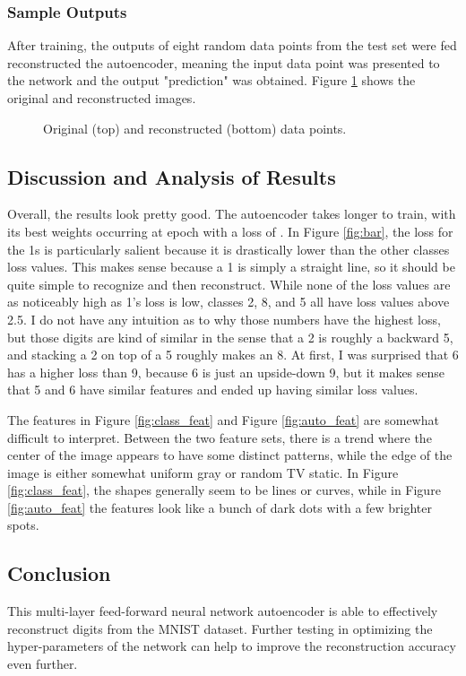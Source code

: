 \documentclass[a4paper, 12pt, titlepage]{article}
\newcommand{\figRef}[1]{Figure \ref{#1}}
\begin{document}
  \subsubsection{Sample Outputs}
  \par After training, the outputs of eight random data points from the test
  set were fed reconstructed the autoencoder, meaning the input data point was
  presented to the network and the output "prediction" was obtained.
  \figRef{fig:samples} shows the original and reconstructed images.
  \begin{figure}[htb]
    \centering
    
    \caption{Original (top) and reconstructed (bottom) data points.}
    \label{fig:samples}
  \end{figure}

  \subsection{Discussion and Analysis of Results}
  \par Overall, the results look pretty good.
  The autoencoder takes longer to train, with its best weights occurring at
  epoch \unskip{} with a loss of
  \unskip{}.
  In \figRef{fig:bar}, the loss for the 1s is particularly salient because it
  is drastically lower than the other classes loss values.
  This makes sense because a 1 is simply a straight line, so it should be quite
  simple to recognize and then reconstruct.
  While none of the loss values are as noticeably high as 1's loss is low,
  classes 2, 8, and 5 all have loss values above 2.5.
  I do not have any intuition as to why those numbers have the highest loss,
  but those digits are kind of similar in the sense that a 2 is roughly a
  backward 5, and stacking a 2 on top of a 5 roughly makes an 8.
  At first, I was surprised that 6 has a higher loss than 9, because 6 is just
  an upside-down 9, but it makes sense that 5 and 6 have similar features and
  ended up having similar loss values.
  \par The features in \figRef{fig:class_feat} and \figRef{fig:auto_feat} are
  somewhat difficult to interpret.
  Between the two feature sets, there is a trend where the center of the image
  appears to have some distinct patterns, while the edge of the image is either
  somewhat uniform gray or random TV static.
  In \figRef{fig:class_feat}, the shapes generally seem to be lines or curves,
  while in \figRef{fig:auto_feat} the features look like a bunch of dark dots
  with a few brighter spots.


  \subsection{Conclusion}
  \par This multi-layer feed-forward neural network autoencoder is able to
  effectively reconstruct digits from the MNIST dataset.
  Further testing in optimizing the hyper-parameters of the network can help to
  improve the reconstruction accuracy even further.
\end{document}
